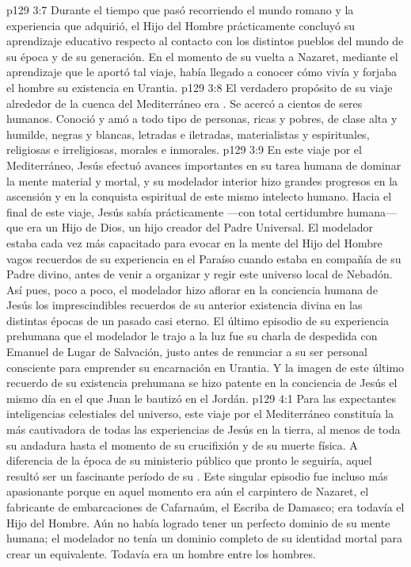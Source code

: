 \vs p129 3:7 \pc Durante el tiempo que pasó recorriendo el mundo romano y la experiencia que adquirió, el Hijo del Hombre prácticamente concluyó su aprendizaje educativo respecto al contacto con los distintos pueblos del mundo de su época y de su generación. En el momento de su vuelta a Nazaret, mediante el aprendizaje que le aportó tal viaje, había llegado a conocer cómo vivía y forjaba el hombre su existencia en Urantia.
\vs p129 3:8 El verdadero propósito de su viaje alrededor de la cuenca del Mediterráneo era . Se acercó a cientos de seres humanos. Conoció y amó a todo tipo de personas, ricas y pobres, de clase alta y humilde, negras y blancas, letradas e iletradas, materialistas y espirituales, religiosas e irreligiosas, morales e inmorales.
\vs p129 3:9 En este viaje por el Mediterráneo, Jesús efectuó avances importantes en su tarea humana de dominar la mente material y mortal, y su modelador interior hizo grandes progresos en la ascensión y en la conquista espiritual de este mismo intelecto humano. Hacia el final de este viaje, Jesús sabía prácticamente ---con total certidumbre humana--- que era un Hijo de Dios, un hijo creador del Padre Universal. El modelador estaba cada vez más capacitado para evocar en la mente del Hijo del Hombre vagos recuerdos de su experiencia en el Paraíso cuando estaba en compañía de su Padre divino, antes de venir a organizar y regir este universo local de Nebadón. Así pues, poco a poco, el modelador hizo aflorar en la conciencia humana de Jesús los imprescindibles recuerdos de su anterior existencia divina en las distintas épocas de un pasado casi eterno. El último episodio de su experiencia prehumana que el modelador le trajo a la luz fue su charla de despedida con Emanuel de Lugar de Salvación, justo antes de renunciar a su ser personal consciente para emprender su encarnación en Urantia. Y la imagen de este último recuerdo de su existencia prehumana se hizo patente en la conciencia de Jesús el mismo día en el que Juan le bautizó en el Jordán.
\vs p129 4:1 Para las expectantes inteligencias celestiales del universo, este viaje por el Mediterráneo constituía la más cautivadora de todas las experiencias de Jesús en la tierra, al menos de toda su andadura hasta el momento de su crucifixión y de su muerte física. A diferencia de la época de su ministerio público que pronto le seguiría, aquel resultó ser un fascinante período de su . Este singular episodio fue incluso más apasionante porque en aquel momento era aún el carpintero de Nazaret, el fabricante de embarcaciones de Cafarnaúm, el Escriba de Damasco; era todavía el Hijo del Hombre. Aún no había logrado tener un perfecto dominio de su mente humana; el modelador no tenía un dominio completo de su identidad mortal para crear un equivalente. Todavía era un hombre entre los hombres.
